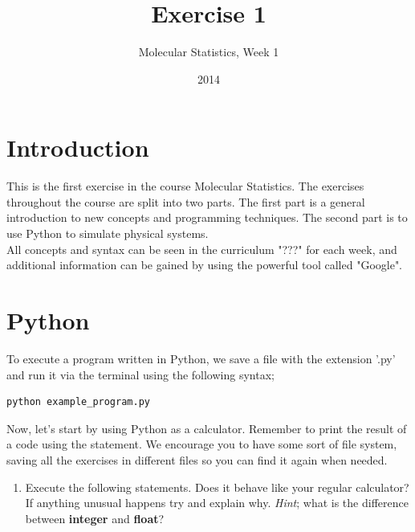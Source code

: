 \documentclass{article}
\title{Exercise 1}
\author{Molecular Statistics, Week 1}
\date{2014}
\begin{document}

\maketitle

\section{Introduction}

This is the first exercise in the course Molecular Statistics. The exercises
throughout the course are split into two parts. The first part is a general
introduction to new concepts and programming techniques. The second part is to use
Python to simulate physical systems.\\

All concepts and syntax can be seen in the curriculum "???" for each
week, and additional information can be gained by using the powerful tool called "Google".

\section{Python}

To execute a program written in Python, we save a file with the extension
'.py' and run it via the terminal using the following syntax;

\begin{lstlisting}
python example_program.py
\end{lstlisting}

Now, let's start by using Python as a calculator.
Remember to print the result of a code using the  statement.
We encourage you to have some sort of file system, saving all the exercises in
different files so you can find it again when needed.

\begin{enumerate}
  \item Execute the following statements. Does it behave like your regular
    calculator? If anything unusual happens try and explain why.
    {\em Hint}; what is the difference between {\bf integer} and {\bf float}?

    \begin{centering}
    \end{centering}
\end{enumerate}
\end{document}
